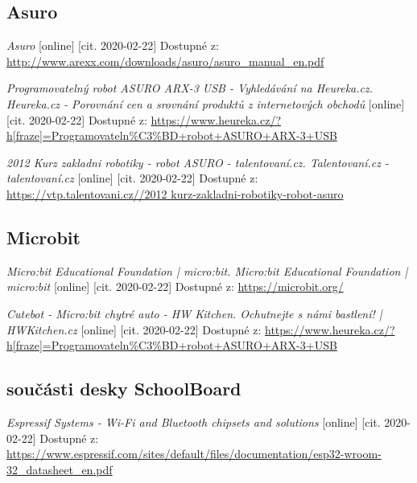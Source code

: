 \documentclass{template/socthesis}
\begin{document}
\begin{thebibliography}{1}
	\subsection*{Asuro}
	
	\textit{Asuro} [online] [cit. 2020-02-22] Dostupné z:
	\url{ http://www.arexx.com/downloads/asuro/asuro_manual_en.pdf}
	
	\textit{Programovatelný robot ASURO ARX-3 USB - Vyhledávání na Heureka.cz. Heureka.cz - Porovnání cen a srovnání produktů z internetových obchodů } [online] [cit. 2020-02-22] Dostupné z:
	\url{https://www.heureka.cz/?h[fraze]=Programovateln%C3%BD+robot+ASURO+ARX-3+USB}
		
		\textit{2012 Kurz zakladni robotiky - robot ASURO - talentovaní.cz. Talentovaní.cz - talentovaní.cz} [online] [cit. 2020-02-22] Dostupné z:
		\url{https://vtp.talentovani.cz//2012 kurz-zakladni-robotiky-robot-asuro}
		
		\subsection*{Microbit}
		
		\textit{Micro:bit Educational Foundation | micro:bit. Micro:bit Educational Foundation | micro:bit} [online] [cit. 2020-02-22] Dostupné z:
		\url{https://microbit.org/}
		
		\textit{Cutebot - Micro:bit chytré auto - HW Kitchen. Ochutnejte s námi bastlení! | HWKitchen.cz} [online] [cit. 2020-02-22] Dostupné z:
		\url{https://www.heureka.cz/?h[fraze]=Programovateln%C3%BD+robot+ASURO+ARX-3+USB}
			
			
			\subsection*{součásti desky SchoolBoard}
			
			
			\textit{Espressif Systems - Wi-Fi and Bluetooth chipsets and solutions } [online] [cit. 2020-02-22] Dostupné z:
			\url{https://www.espressif.com/sites/default/files/documentation/esp32-wroom-32_datasheet_en.pdf}
			

\end{thebibliography}
\end{document}
